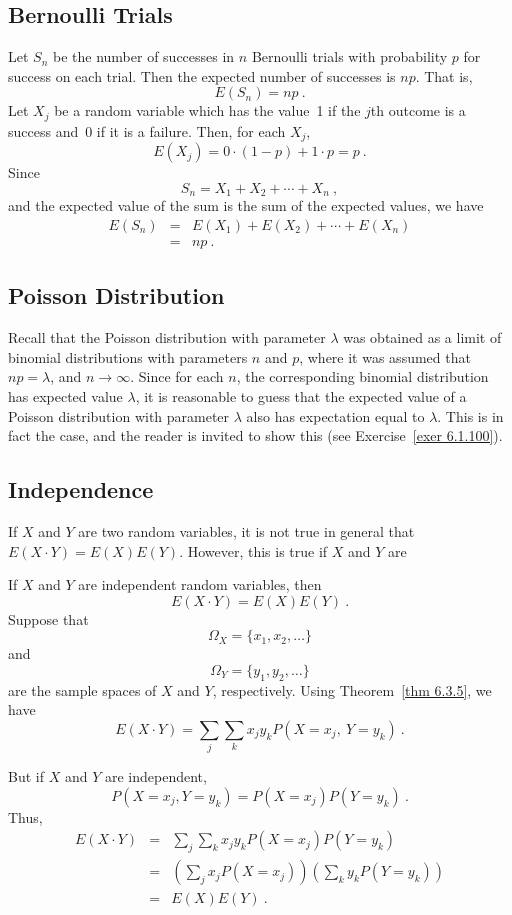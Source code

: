 \subsection*{Bernoulli Trials}

\begin{theorem}\label{thm 6.3} Let $S_n$ be the number of successes in $n$ Bernoulli
trials with probability
$p$ for success on each trial.  Then the expected number of successes is $np$.  That
is,
$$ E(S_n) = np\ .
$$
\proof Let $X_j$ be a random variable which has the value~1 if the $j$th outcome is a
success and~0 if it is a failure.  Then, for each $X_j$,
$$ E(X_j) = 0\cdot(1 - p) + 1\cdot p = p\ .
$$ Since
$$ S_n = X_1 + X_2 +\cdots+ X_n\ ,
$$ and the expected value of the sum is the sum of the expected values, we have
\begin{eqnarray*} E(S_n) & = & E(X_1) + E(X_2) +\cdots+ E(X_n) \\
       & = & np\ .
\end{eqnarray*}
\end{theorem}

\subsection*{Poisson Distribution}

Recall that the Poisson distribution with parameter $\lambda$ was obtained as a limit
of binomial distributions with parameters $n$ and $p$, where it was assumed that $np =
\lambda$, and $n \rightarrow \infty$.  Since for each $n$, the corresponding binomial
distribution has expected value $\lambda$, it is reasonable to guess that the expected
value of a Poisson distribution with parameter $\lambda$ also has expectation equal to
$\lambda$. This is in fact the case, and the reader is invited to show this (see
Exercise~\ref{exer 6.1.100}).

\subsection*{Independence}

If $X$ and $Y$ are two random variables, it is not true in general that $E(X
\cdot Y) = E(X)E(Y)$.  However, this is true if $X$ and $Y$ are  

\begin{theorem}\label{thm 6.4} If $X$ and $Y$ are independent random variables, then
$$ E(X \cdot Y) = E(X)E(Y)\ .
$$
\proof Suppose that
$$\Omega_X = \{x_1, x_2, \ldots\}$$  and
$$\Omega_Y = \{y_1, y_2, \ldots\}$$ are the sample spaces of $X$ and $Y$,
respectively.  Using Theorem~\ref{thm 6.3.5}, we have
$$ E(X \cdot Y) = \sum_j \sum_k x_jy_k P(X = x_j,\ Y = y_k)\ .
$$

But if $X$ and $Y$ are independent,
$$ P(X = x_j, Y = y_k) = P(X = x_j)P(Y = y_k)\ .
$$ Thus,
\begin{eqnarray*} E(X \cdot Y) & = & \sum_j\sum_k x_j y_k P(X = x_j) P(Y = y_k) \\
             & = & \left(\sum_j x_j P(X = x_j)\right) \left(\sum_k y_k P(Y =
y_k)\right) \\
             & = &E(X) E(Y)\ .
\end{eqnarray*}
\end{theorem}

